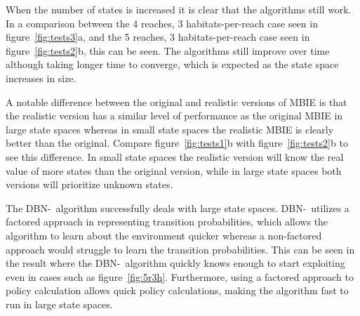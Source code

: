 When the number of states is increased it is clear that the algorithms still
work. In a comparison between the 4 reaches, 3 habitats-per-reach case seen in
figure~\ref{fig:tests3}a, and the 5 reaches, 3 habitats-per-reach case seen
in figure~\ref{fig:tests2}b, this can be seen. The algorithms still improve
over time although taking longer time to converge, which is expected as the
state space increases in size. 

A notable difference between the original and realistic versions of MBIE is
that the realistic version has a similar level of performance as the original
MBIE in large state spaces whereas in small state spaces the realistic MBIE
is clearly better than the original. Compare figure~\ref{fig:tests1}b with
figure~\ref{fig:tests2}b to see this difference. In small state spaces the
realistic version will know the real value of more states than the original
version, while in large state spaces both versions will prioritize unknown
states.

The DBN-\etre\ algorithm successfully deals with large state spaces. DBN-\etre\
utilizes a factored approach in representing transition probabilities, which
allows the algorithm to learn about the environment quicker whereas a
non-factored approach would struggle to learn the transition probabilities.
This can be seen in the result where the DBN-\etre\ algorithm quickly knows
enough to start exploiting even in cases such as figure~\ref{fig:5r3h}.
Furthermore, using a factored approach to policy calculation allows quick
policy calculations, making the algorithm fast to run in large state spaces.
